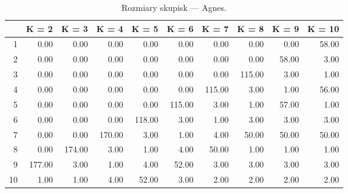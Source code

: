 \begin{table}[ht]
\centering
\begin{tabular}{rrrrrrrrrr}
  \hline
 & K = 2 & K = 3 & K = 4 & K = 5 & K = 6 & K = 7 & K = 8 & K = 9 & K = 10 \\ 
  \hline
1 & 0.00 & 0.00 & 0.00 & 0.00 & 0.00 & 0.00 & 0.00 & 0.00 & 58.00 \\ 
  2 & 0.00 & 0.00 & 0.00 & 0.00 & 0.00 & 0.00 & 0.00 & 58.00 & 3.00 \\ 
  3 & 0.00 & 0.00 & 0.00 & 0.00 & 0.00 & 0.00 & 115.00 & 3.00 & 1.00 \\ 
  4 & 0.00 & 0.00 & 0.00 & 0.00 & 0.00 & 115.00 & 3.00 & 1.00 & 56.00 \\ 
  5 & 0.00 & 0.00 & 0.00 & 0.00 & 115.00 & 3.00 & 1.00 & 57.00 & 1.00 \\ 
  6 & 0.00 & 0.00 & 0.00 & 118.00 & 3.00 & 1.00 & 3.00 & 3.00 & 3.00 \\ 
  7 & 0.00 & 0.00 & 170.00 & 3.00 & 1.00 & 4.00 & 50.00 & 50.00 & 50.00 \\ 
  8 & 0.00 & 174.00 & 3.00 & 1.00 & 4.00 & 50.00 & 1.00 & 1.00 & 1.00 \\ 
  9 & 177.00 & 3.00 & 1.00 & 4.00 & 52.00 & 3.00 & 3.00 & 3.00 & 3.00 \\ 
  10 & 1.00 & 1.00 & 4.00 & 52.00 & 3.00 & 2.00 & 2.00 & 2.00 & 2.00 \\ 
   \hline
\end{tabular}
\caption{Rozmiary skupisk --- Agnes.} 
\label{A3}
\end{table}
